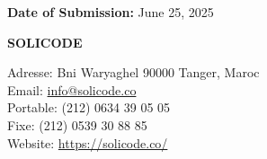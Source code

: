 \documentclass{report}
\begin{document}
\vspace{1.5cm}

\begin{flushleft} %
{\large\textbf{Date of Submission:}}
\vspace{0.3cm}
June 25, 2025
\end{flushleft}

\vspace*{\fill} %

\begin{center}
\textbf{SOLICODE}
\par
\small

\par
Adresse: Bni Waryaghel 90000 Tanger, Maroc\\
Email: \href{mailto:info@solicode.co}{info@solicode.co}\\
Portable: (212) 0634 39 05 05\\
Fixe: (212) 0539 30 88 85\\
Website: \url{https://solicode.co/}
\end{center}

\newpage
\end{document}
